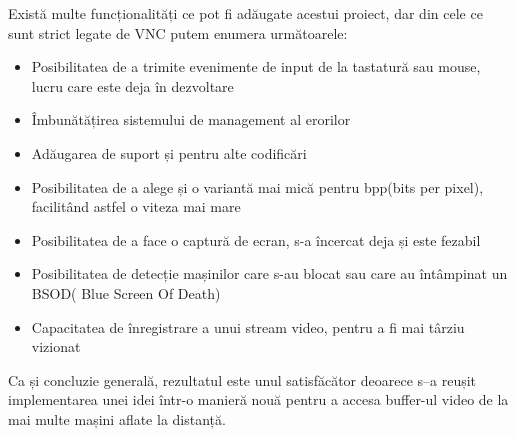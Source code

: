 Există multe funcționalități ce pot fi adăugate acestui proiect, dar din cele ce sunt strict legate de VNC putem enumera următoarele:
\begin{itemize}
  \item Posibilitatea de a trimite evenimente de input de la tastatură sau mouse, lucru care este deja în dezvoltare
  \item Îmbunătățirea sistemului de management al erorilor
  \item Adăugarea de suport și pentru alte codificări
  \item Posibilitatea de a alege și o variantă mai mică pentru bpp(bits per pixel), facilitând astfel o viteza mai mare
  \item Posibilitatea de a face o captură de ecran, s-a încercat deja și este fezabil
  \item Posibilitatea de detecție mașinilor care s-au blocat sau care au întâmpinat un BSOD( Blue Screen Of Death)
  \item Capacitatea de înregistrare a unui stream video, pentru a fi mai târziu vizionat
\end{itemize}


Ca și concluzie generală, rezultatul este unul satisfăcător deoarece s–a reușit implementarea unei idei într-o manieră nouă pentru a accesa buffer-ul video de la mai multe mașini aflate la distanță.


